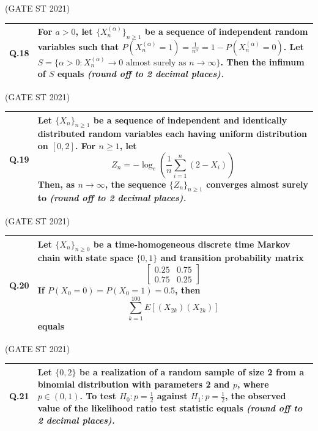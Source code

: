 \documentclass[journal,12pt,onecolumn]{IEEEtran}
\theoremstyle{remark}
\begin{document}
\bigskip
\hfill (GATE ST 2021)
\\

\begin{tabular}{|p{1cm}|p{14cm}|}
\hline
\textbf{Q.18} &
For $a > 0$, let $\{X_n^{(\alpha)}\}_{n \geq 1}$ be a sequence of independent random variables such that $P(X_n^{(\alpha)} = 1) = \frac{1}{n^\alpha} = 1 - P(X_n^{(\alpha)} = 0)$. Let $S = \{\alpha > 0 : X_n^{(\alpha)} \to 0 \text{ almost surely as } n \to \infty\}$. Then the infimum of $S$ equals \textit{(round off to 2 decimal places).} \\
\hline
\end{tabular}

\bigskip
\hfill (GATE ST 2021)
\\
\newpage
\begin{tabular}{|p{1cm}|p{14cm}|}
\hline
\textbf{Q.19} &
Let $\{X_n\}_{n \geq 1}$ be a sequence of independent and identically distributed random variables each having uniform distribution on $[0,2]$. For $n \geq 1$, let
$$
Z_n = -\log_e \left( \frac{1}{n} \sum_{i=1}^n (2 - X_i) \right)
$$
Then, as $n \to \infty$, the sequence $\{Z_n\}_{n \geq 1}$ converges almost surely to \textit{(round off to 2 decimal places).}\\
\hline
\end{tabular}

\bigskip
\hfill (GATE ST 2021)
\\

\begin{tabular}{|p{1cm}|p{14cm}|}
\hline
\textbf{Q.20} &
Let $\{X_n\}_{n \geq 0}$ be a time-homogeneous discrete time Markov chain with state space $\{0,1\}$ and transition probability matrix
$$
\begin{bmatrix}
0.25 & 0.75 \\
0.75 & 0.25
\end{bmatrix}
$$
If $P(X_0 = 0) = P(X_0 = 1) = 0.5$, then
$$
\sum_{k=1}^{100} E\left[(X_{2k})(X_{2k})\right]
$$
equals\\
\hline
\end{tabular}

\bigskip
\hfill (GATE ST 2021)
\\

\begin{tabular}{|p{1cm}|p{14cm}|}
\hline
\textbf{Q.21} &
Let $\{0,2\}$ be a realization of a random sample of size 2 from a binomial distribution with parameters 2 and $p$, where $p \in (0,1)$. To test $H_0: p = \frac{1}{2}$ against $H_1: p = \frac{1}{2}$, the observed value of the likelihood ratio test statistic equals \textit{(round off to 2 decimal places).}\\
\hline
\end{tabular}
\end{document}
